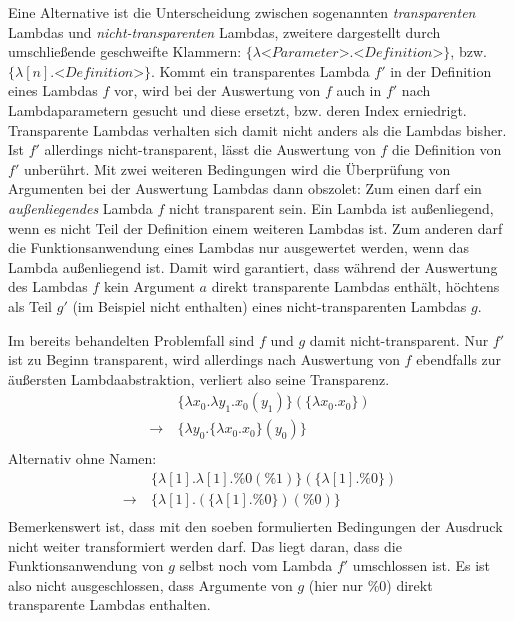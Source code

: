  Eine Alternative ist die Unterscheidung zwischen sogenannten \emph{transparenten} Lambdas und \emph{nicht-transparenten} Lambdas, zweitere dargestellt durch umschließende geschweifte Klammern: $\{\lambda \textit{<Parameter>}.\textit{<Definition>}\}$, bzw. $\{\lambda [n].\textit{<Definition>}\}$. Kommt ein transparentes Lambda $f'$ in der Definition eines Lambdas $f$ vor, wird bei der Auswertung von $f$ auch in $f'$ nach Lambdaparametern gesucht und diese ersetzt, bzw. deren Index erniedrigt. Transparente Lambdas verhalten sich damit nicht anders als die Lambdas bisher. Ist $f'$ allerdings nicht-transparent, lässt die Auswertung von $f$ die Definition von $f'$ unberührt. 
 Mit zwei weiteren Bedingungen wird die Überprüfung von Argumenten bei der Auswertung Lambdas dann obszolet: 
 Zum einen darf ein \emph{außenliegendes} Lambda $f$ nicht transparent sein. Ein Lambda ist außenliegend, wenn es nicht Teil der Definition einem weiteren Lambdas ist. Zum anderen darf die Funktionsanwendung eines Lambdas nur ausgewertet werden, wenn das Lambda außenliegend ist. Damit wird garantiert, dass während der Auswertung des Lambdas $f$ kein Argument $a$ direkt transparente Lambdas enthält, höchtens als Teil $g'$ (im Beispiel nicht enthalten) eines nicht-transparenten Lambdas $g$.

Im bereits behandelten Problemfall sind $f$ und $g$ damit nicht-transparent. Nur $f'$ ist zu Beginn transparent, wird allerdings nach Auswertung von $f$ ebendfalls zur äußersten Lambdaabstraktion, verliert also seine Transparenz. 
\begin{align*}
    ~           &~\{\lambda x_0 .\lambda y_1 .x_0(y_1)\}(\{\lambda x_0 .x_0\}) \\
    \rightarrow &~\{\lambda y_0 .\{\lambda x_0 .x_0\}(y_0)\}\\
\end{align*}
Alternativ ohne Namen:
\begin{align*}
    ~           &~\{\lambda [1] .\lambda [1] .\%0(\%1)\}(\{\lambda [1] .\%0\}) \\
    \rightarrow &~\{\lambda [1] .(\{\lambda [1] .\%0\})(\%0)\}\\
\end{align*}
Bemerkenswert ist, dass mit den soeben formulierten Bedingungen der Ausdruck nicht weiter transformiert werden darf. Das liegt daran, dass die Funktionsanwendung von $g$ selbst noch vom Lambda $f'$ umschlossen ist. Es ist also nicht ausgeschlossen, dass Argumente von $g$ (hier nur $\%0$) direkt transparente Lambdas enthalten.


